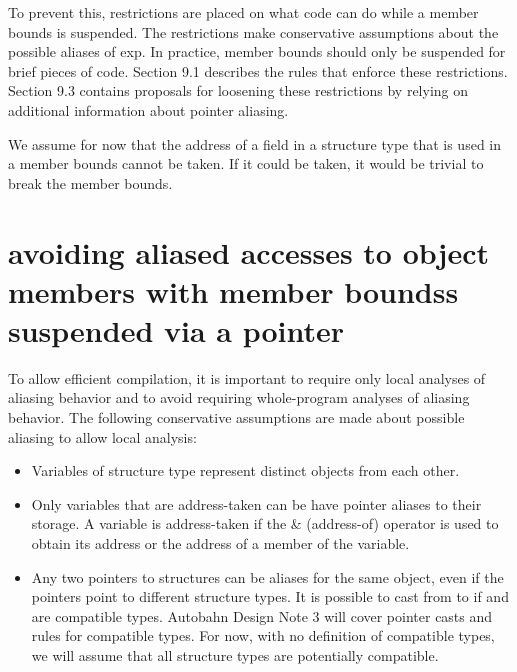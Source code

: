 To prevent this, restrictions are placed on what code can do while a
member bounds is suspended. The restrictions make conservative
assumptions about the possible aliases of exp. In practice, member
bounds should only be suspended for brief pieces of code. Section 9.1
describes the rules that enforce these restrictions. Section 9.3
contains proposals for loosening these restrictions by relying on
additional information about pointer aliasing.

We assume for now that the address of a field in a structure type that
is used in a member bounds cannot be taken. If it could be taken, it
would be trivial to break the member bounds.

\section{\texorpdfstring{\protect\hypertarget{ux5fRef419201770}{}{\protect\hypertarget{ux5fRef420578671}{}{\protect\hypertarget{ux5fToc420589208}{}{\protect\hypertarget{ux5fToc422906999}{}{\protect\hypertarget{ux5fToc424307728}{}{\protect\hypertarget{ux5fToc426641105}{}{\protect\hypertarget{ux5fToc435434987}{}{\protect\hypertarget{ux5fToc437460820}{}{\protect\hypertarget{ux5fToc440445501}{}{\protect\hypertarget{ux5fToc440449283}{}{\protect\hypertarget{ux5fToc440551933}{}{}}}}}}}}}}}avoiding
aliased accesses to object members with member boundss suspended via a
pointer}{avoiding aliased accesses to object members with member boundss suspended via a pointer}}\label{avoiding-aliased-accesses-to-object-members-with-member-boundss-suspended-via-a-pointer}

To allow efficient compilation, it is important to require only local
analyses of aliasing behavior and to avoid requiring whole-program
analyses of aliasing behavior. The following conservative assumptions
are made about possible aliasing to allow local analysis:

\begin{itemize}
\item
  Variables of structure type represent distinct objects from each
  other.
\item
  Only variables that are address-taken can be have pointer aliases to
  their storage. A variable is address-taken if the \& (address-of)
  operator is used to obtain its address or the address of a member of
  the variable.
\item
  Any two pointers to structures can be aliases for the same object,
  even if the pointers point to different structure types. It is
  possible to cast from  to
  \ptrT if  and
   are compatible types. Autobahn Design Note 3 will cover
  pointer casts and rules for compatible types. For now, with no
  definition of compatible types, we will assume that all structure
  types are potentially compatible.
\end{itemize}

